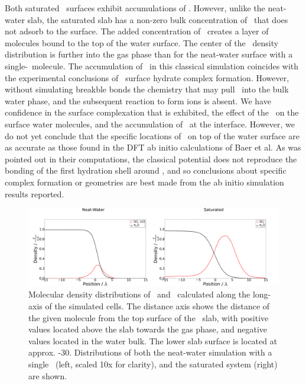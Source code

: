 Both saturated \suldiox~surfaces exhibit accumulations of \suldiox. However, unlike the neat-water slab, the saturated slab has a non-zero bulk concentration of \suldiox~that does not adsorb to the surface. The added concentration of \suldiox~creates a layer of molecules bound to the top of the water surface. The center of the \suldiox~density distribution is further into the gas phase than for the neat-water surface with a single-\suldiox~molecule. The accumulation of \suldiox~in this classical simulation coincides with the experimental conclusions of \suldiox~surface hydrate complex formation. However, without simulating breakble bonds the chemistry that may pull \suldiox~into the bulk water phase, and the subsequent reaction to form ions is absent. We have confidence in the surface complexation that is exhibited, the effect of the \suldiox~on the surface water molecules, and the accumulation of \suldiox~at the interface. However, we do not yet conclude that the specific locations of \suldiox~on top of the water surface are as accurate as those found in the DFT ab initio calculations of Baer et al.\cite{Baer2010} As was pointed out in their computations, the classical potential does not reproduce the bonding of the first hydration shell around \suldiox, and so conclusions about specific complex formation or geometries are best made from the ab initio simulation results reported.

\begin{figure}[h!]
	\begin{center}
		\includegraphics[scale=1.0]{images/density/density.png}
		\caption{Molecular density distributions of \wat~and \suldiox~calculated along the long-axis of the simulated cells. The distance axis shows the distance of the given molecule from the top surface of the \wat~slab, with positive values located above the slab towards the gas phase, and negative values located in the water bulk. The lower slab surface is located at approx. -30\angs. Distributions of both the neat-water simulation with a single \suldiox~(left, scaled 10x for clarity), and the saturated system (right) are shown.}
		\label{fig:density}
	\end{center}
\end{figure}
